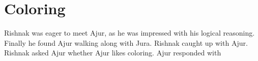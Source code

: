 \chapter{Coloring}
Rishnak was eager to meet Ajur, as he was impressed with his logical reasoning. Finally he found Ajur walking along with Jura. Rishnak caught up with Ajur. Rishnak asked Ajur whether Ajur likes coloring. Ajur responded with 